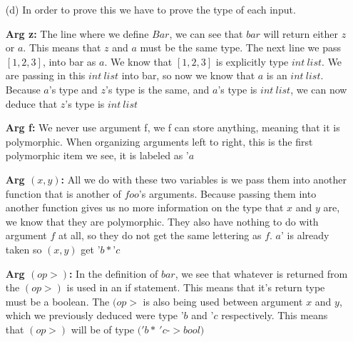 \documentclass[11pt]{article}
\begin{document}
\begin{enumerate}
\begin{itemize}
\begin{verbatim}
\end{verbatim}
\item[(d)] In order to prove this we have to prove the type of each input.
\\
\item[\textbf{Arg z:}] The line where we define $Bar$, we can see that $bar$ will return either $z$ or $a$.  This means that $z$ and $a$ must be the same type.  The next line we pass $[1, 2, 3]$, into bar as $a$.  We know that $[1, 2, 3]$ is explicitly type $int\ list$.  We are passing in this $int\ list$ into bar, so now we know that $a$ is an $int\ list$.  Because $a$'s type and $z$'s type is the same, and $a$'s type is $int\ list$, we can now deduce that $z$'s type is $int\ list$ 
\\
\item[\textbf{Arg f:}] We never use argument f, we f can store anything, meaning that it is polymorphic.  When organizing arguments left to right, this is the first polymorphic item we see,  it is labeled as '$a$
\\
\item[\textbf{Arg $(x, y)$:}] All we do with these two variables is we pass them into another function that is another of $foo$'s arguments.  Because passing them into another function gives us no more information on the type that $x$ and $y$ are, we know that they are polymorphic.  They also have nothing to do with argument $f$ at all, so they do not get the same lettering as $f$.  $a$' is already taken so $(x, y)$ get '$b * $'$c$
\\
\item[\textbf{Arg $(op >)$:}]  In the definition of $bar$, we see that whatever is returned from the $(op >)$ is used in an if statement.  This means that it's return type must be a boolean.  The $(op >$ is also being used between argument $x$ and $y$, which we previously deduced were type '$b$ and '$c$ respectively.  This means that $(op >)$ will be of type $('b *\ 'c $-$> bool)$ \\
\end{itemize}
\end{enumerate}
\end{document}
